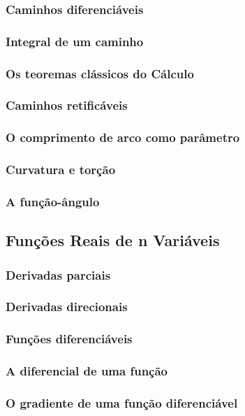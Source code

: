 \documentclass{article}
\theoremstyle{plain}
\theoremstyle{definition}
\theoremstyle{remark}
\begin{document}
   \subsubsection{ Caminhos diferenciáveis}
   \subsubsection{ Integral de um caminho}
   \subsubsection{ Os teoremas clássicos do Cálculo}
   \subsubsection{ Caminhos retificáveis}
   \subsubsection{ O comprimento de arco como parâmetro}
   \subsubsection{ Curvatura e torção}
   \subsubsection{ A função-ângulo}
\subsection{ Funções Reais de n Variáveis}
   \subsubsection{Derivadas parciais}
   \subsubsection{Derivadas direcionais}
   \subsubsection{Funções diferenciáveis}
   \subsubsection{A diferencial de uma função}
   \subsubsection{O gradiente de uma função diferenciável}
\end{document}

